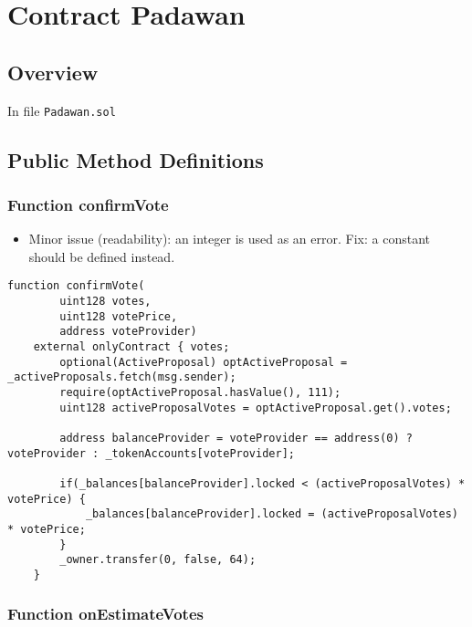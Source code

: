 
\chapter{Contract Padawan}

\minitoc

\section{Overview}


In file {\tt Padawan.sol}

\section{Public Method Definitions}

\subsection{Function confirmVote}

\begin{itemize}
\item Minor issue (readability): an integer is used as an error. Fix:
  a constant should be defined instead.
\end{itemize}

\begin{lstlisting}[firstnumber=89]
    function confirmVote(
        uint128 votes,
        uint128 votePrice,
        address voteProvider)
    external onlyContract { votes;
        optional(ActiveProposal) optActiveProposal = _activeProposals.fetch(msg.sender);
        require(optActiveProposal.hasValue(), 111);
        uint128 activeProposalVotes = optActiveProposal.get().votes;

        address balanceProvider = voteProvider == address(0) ? voteProvider : _tokenAccounts[voteProvider];

        if(_balances[balanceProvider].locked < (activeProposalVotes) * votePrice) {
            _balances[balanceProvider].locked = (activeProposalVotes) * votePrice;
        }
        _owner.transfer(0, false, 64);
    }
\end{lstlisting}

\subsection{Function onEstimateVotes}

